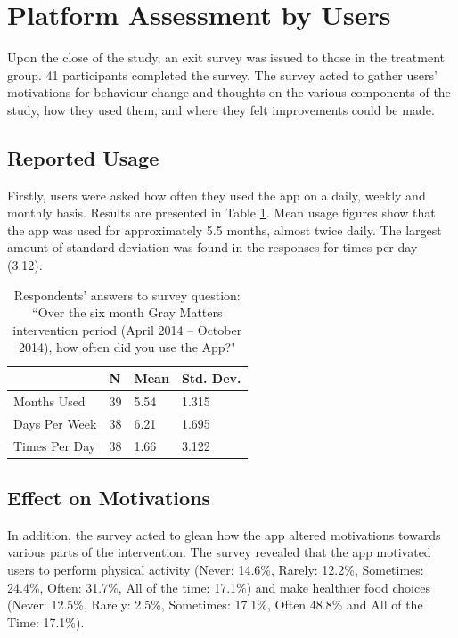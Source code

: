 \section{Platform Assessment by Users}
Upon the close of the study, an exit survey was issued to those in the treatment group. 41 participants completed the survey. The survey acted to gather users’ motivations for behaviour change and thoughts on the various components of the study, how they used them, and where they felt improvements could be made.

\subsection{Reported Usage}
Firstly, users were asked how often they used the app on a daily, weekly and monthly basis. Results are presented in Table \ref{tbl: exit-survey-appusage}. Mean usage figures show that the app was used for approximately 5.5 months, almost twice daily. The largest amount of standard deviation was found in the responses for times per day (3.12).

\begin{table}[h]
\centering
\caption{Respondents' answers to survey question: ``Over the six month Gray Matters intervention period (April 2014 – October 2014), how often did you use the App?"}
\label{tbl: exit-survey-appusage}
\begin{tabular}{@{}llll@{}}
\toprule
              & N  & Mean & Std. Dev. \\ \midrule
Months Used   & 39 & 5.54 & 1.315     \\
Days Per Week & 38 & 6.21 & 1.695     \\
Times Per Day & 38 & 1.66 & 3.122     \\ \bottomrule
\end{tabular}
\end{table}

\subsection{Effect on Motivations}
In addition, the survey acted to glean how the app altered motivations towards various parts of the intervention. The survey revealed that the app motivated users to perform physical activity (Never: 14.6\%, Rarely: 12.2\%, Sometimes: 24.4\%, Often: 31.7\%, All of the time: 17.1\%) and make healthier food choices (Never: 12.5\%, Rarely: 2.5\%, Sometimes: 17.1\%, Often 48.8\% and All of the Time: 17.1\%).

